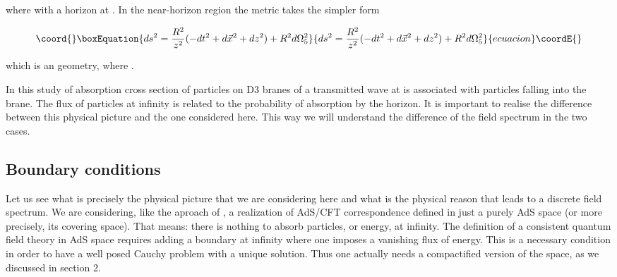 \documentclass[a4paper,12pt]{article}
\begin{document}
\noindent where \coordHE{}  with a horizon at \coordHE{}. 
In the near-horizon region the metric takes the simpler form

\begin{equation}\coord{}\boxEquation{
ds^2=\frac{R^2}{z^2}(-dt^2+d\vec{x}^2+dz^2) + R^2d\Omega_5^2
}{
ds^2=\frac{R^2}{z^2}(-dt^2+d\vec{x}^2+dz^2) + R^2d\Omega_5^2
}{ecuacion}\coordE{}\end{equation}

\noindent which is an \coordHE{} geometry, where \coordHE{}.

In this study of absorption cross section of particles
on D3 branes of \cite{Kle1} a transmitted wave at 
\coordHE{} is associated with particles falling into 
the brane. The flux of particles at infinity is related to the  probability of 
absorption by the horizon. 
It is important to realise the difference between this physical picture 
and the one considered here.
This way we will understand the difference of the field spectrum in the 
two cases.

\subsection{Boundary conditions}

Let us see what is precisely the physical picture that we are considering here
and what is the physical reason that leads to a discrete field spectrum.
We are considering, like the aproach of \cite{Wi},
a realization of AdS/CFT correspondence  defined in just 
a purely AdS space (or more precisely, its covering space).
That means:  there is nothing to absorb particles, or energy, at infinity.
The definition of a consistent quantum field theory in AdS space
requires adding a boundary at  infinity where  one imposes a
vanishing flux of energy.  This is a necessary condition 
in order to have a well posed Cauchy problem with a unique solution\cite{QAdS1,QAdS2}.
Thus one actually needs a compactified
version of the space, as we discussed  in section 2.
\end{document}
